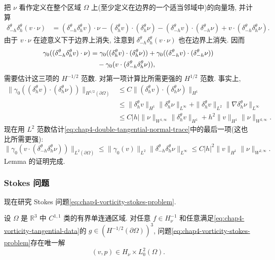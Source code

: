 \begin{Proof}
把 $\nu$ 看作定义在整个区域 $\Omega$ 上(至少定义在边界的一个适当邻域中)的向量场, 并计算
\begin{align*}
 \delta_{-h}^\theta\delta_h^\theta(v\cdot\nu)
 &=(\delta_{-h}^\theta\delta_h^\theta v)\cdot\nu
 -(\delta_h^\theta v)\cdot(\delta_h^\theta\nu)
 -(\delta_{-h}^\theta v)\cdot(\delta_{-h}^\theta\nu)
 +v\cdot(\delta_{-h}^\theta\delta_h^\theta\nu).
\end{align*}
由于 $v\cdot\nu$ 在迹意义下于边界上消失, 注意到 $\delta_{-h}^\theta\delta_h^\theta(v\cdot\nu)$ 也在边界上消失. 因而
\begin{align}
 \gamma_0((\delta_{-h}^\theta\delta_h^\theta v)\cdot\nu)
 &=\gamma_0((\delta_h^\theta v)\cdot(\delta_h^\theta\nu))
 +\gamma_0((\delta_{-h}^\theta v)\cdot(\delta_{-h}^\theta\nu))\notag\\
 &\quad-\gamma_0(v\cdot(\delta_{-h}^\theta\delta_h^\theta\nu)),
 \label{eq:chap4-double-tangential-normal-trace}
\end{align}
需要估计这三项的 $H^{-1/2}$ 范数. 对第一项计算比所需更强的 $H^{1/2}$ 范数. 事实上,
\begin{align*}
 \|\gamma_0((\delta_h^\theta v)\cdot(\delta_h^\theta\nu))\|_{H^{1/2}(\partial\Omega)}
 &\leq C\|(\delta_h^\theta v)\cdot(\delta_h^\theta\nu)\|_{H^1}\\
 &\leq\|\delta_h^\theta v\|_{H^1}\|\delta_h^\theta\nu\|_{L^\infty}
 +\|\delta_h^\theta v\|_{L^2}\|\nabla\delta_h^\theta\nu\|_{L^\infty}\\
 &\leq C|h|\|\nu\|_{W^{1,\infty}}\|\delta_h^\theta v\|_{H^1}
 +h^2\|v\|_{H^1}\|\nu\|_{W^{2,\infty}}.
\end{align*}
现在用 $L^2$ 范数估计\eqref{eq:chap4-double-tangential-normal-trace}中的最后一项(这也比所需更强):
\[
 \|\gamma_0(v\cdot(\delta_{-h}^\theta\delta_h^\theta\nu))\|_{L^2(\partial\Omega)}
 \leq\|\gamma_0(v)\|_{L^2}\|\delta_{-h}^\theta\delta_h^\theta\nu\|_{L^\infty}
 \leq C|h|^2\|v\|_{H^1}\|\nu\|_{W^{2,\infty}}.
\]
Lemma 的证明完成.
\end{Proof}

\subsubsection{Stokes 问题}
\label{subsec:chap4-vorticity-stokes}

现在研究 Stokes 问题\eqref{eq:chap4-vorticity-stokes-problem}.

\begin{Theorem}
\label{thm:chap4-vorticity-stokes-wellposedness}
设 $\Omega$ 是 $\mathbb R^3$ 中 $C^{1,1}$ 类的有界单连通区域. 对任意 $f\in H_\nu^{-1}$ 和任意满足\eqref{eq:chap4-vorticity-tangential-data}的 $g\in(H^{-1/2}(\partial\Omega))^3$, 问题\eqref{eq:chap4-vorticity-stokes-problem}存在唯一解
\[
 (v,p)\in H_\nu\times L_0^2(\Omega).
\]
\end{Theorem}

